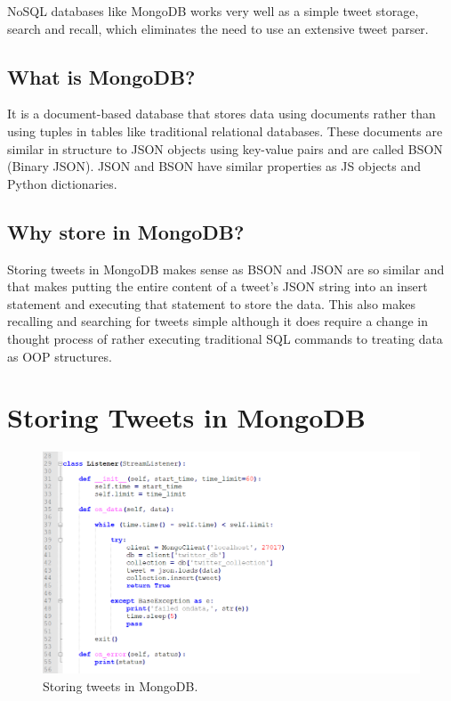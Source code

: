 NoSQL databases like MongoDB works very well as a simple tweet storage, search and recall, which eliminates the need to use an extensive tweet parser.

\subsection{What is MongoDB?}

It is a document-based database that stores data using documents rather than using tuples in tables like traditional relational databases. These documents are similar in structure to JSON objects using key-value pairs and are called BSON (Binary JSON). JSON and BSON have similar properties as JS objects and Python dictionaries.

\subsection{Why store in MongoDB?}

Storing tweets in MongoDB makes sense as BSON and JSON are so similar and that makes putting the entire content of a tweet's JSON string into an insert statement and executing that statement to store the data. This also makes recalling and searching for tweets simple although it does require a change in thought process of rather executing traditional SQL commands to treating data as OOP structures.

\section{Storing Tweets in MongoDB}

\begin{figure}[ht!]
	\centering
	\includegraphics[width=200mm]{code71.png}
	\caption{Storing tweets in MongoDB. \label{overflow}}
\end{figure}

